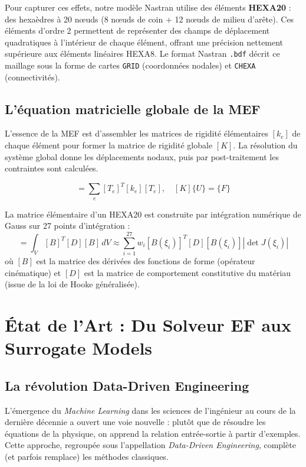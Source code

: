 \documentclass[journal, a4paper, twocolumn]{IEEEtran}
\begin{document}
Pour capturer ces effets, notre modèle Nastran utilise des éléments \textbf{HEXA20} : des hexaèdres à 20 nœuds (8 nœuds de coin + 12 nœuds de milieu d'arête). Ces éléments d'ordre 2 permettent de représenter des champs de déplacement quadratiques à l'intérieur de chaque élément, offrant une précision nettement supérieure aux éléments linéaires HEXA8. Le format Nastran \texttt{.bdf} décrit ce maillage sous la forme de cartes \texttt{GRID} (coordonnées nodales) et \texttt{CHEXA} (connectivités).

\subsection{L'équation matricielle globale de la MEF}

L'essence de la MEF est d'assembler les matrices de rigidité élémentaires $[k_e]$ de chaque élément pour former la matrice de rigidité globale $[K]$. La résolution du système global donne les déplacements nodaux, puis par post-traitement les contraintes sont calculées.

\begin{equation}
    [K] = \sum_e [T_e]^T [k_e] [T_e], \quad [K]\{U\} = \{F\}
\end{equation}

La matrice élémentaire d'un HEXA20 est construite par intégration numérique de Gauss sur 27 points d'intégration :
\begin{equation}
    [k_e] = \int_V [B]^T [D] [B] \, dV \approx \sum_{i=1}^{27} w_i [B(\xi_i)]^T [D] [B(\xi_i)] |\det J(\xi_i)|
\end{equation}
où $[B]$ est la matrice des dérivées des fonctions de forme (opérateur cinématique) et $[D]$ est la matrice de comportement constitutive du matériau (issue de la loi de Hooke généralisée).

\section{État de l'Art : Du Solveur EF aux Surrogate Models}

\subsection{La révolution Data-Driven Engineering}

L'émergence du \textit{Machine Learning} dans les sciences de l'ingénieur au cours de la dernière décennie a ouvert une voie nouvelle : plutôt que de résoudre les équations de la physique, on apprend la relation entrée-sortie à partir d'exemples. Cette approche, regroupée sous l'appellation \textit{Data-Driven Engineering}, complète (et parfois remplace) les méthodes classiques.
\end{document}
